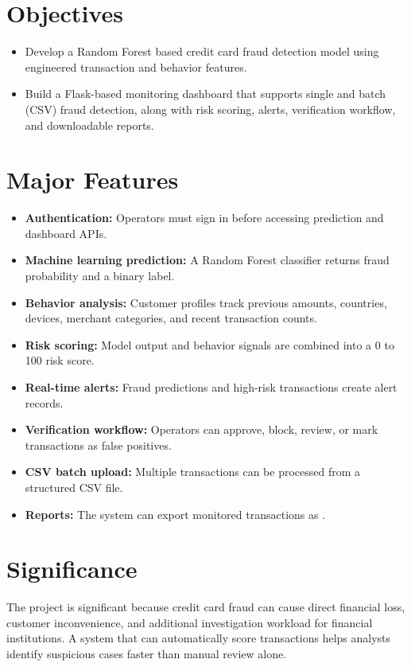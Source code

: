 \documentclass[12pt,a4paper]{report}
\begin{document}
\section{Objectives}
\begin{itemize}
    \item Develop a Random Forest based credit card fraud detection model using engineered transaction and behavior features.
    \item Build a Flask-based monitoring dashboard that supports single and batch (CSV) fraud detection, along with risk scoring, alerts, verification workflow, and downloadable reports.
\end{itemize}

\section{Major Features}
\begin{itemize}
    \item \textbf{Authentication:} Operators must sign in before accessing prediction and dashboard APIs.
    \item \textbf{Machine learning prediction:} A Random Forest classifier returns fraud probability and a binary label.
    \item \textbf{Behavior analysis:} Customer profiles track previous amounts, countries, devices, merchant categories, and recent transaction counts.
    \item \textbf{Risk scoring:} Model output and behavior signals are combined into a 0 to 100 risk score.
    \item \textbf{Real-time alerts:} Fraud predictions and high-risk transactions create alert records.
    \item \textbf{Verification workflow:} Operators can approve, block, review, or mark transactions as false positives.
    \item \textbf{CSV batch upload:} Multiple transactions can be processed from a structured CSV file.
    \item \textbf{Reports:} The system can export monitored transactions as .
\end{itemize}

\section{Significance}
The project is significant because credit card fraud can cause direct financial loss, customer inconvenience, and additional investigation workload for financial institutions. A system that can automatically score transactions helps analysts identify suspicious cases faster than manual review alone.
\end{document}
